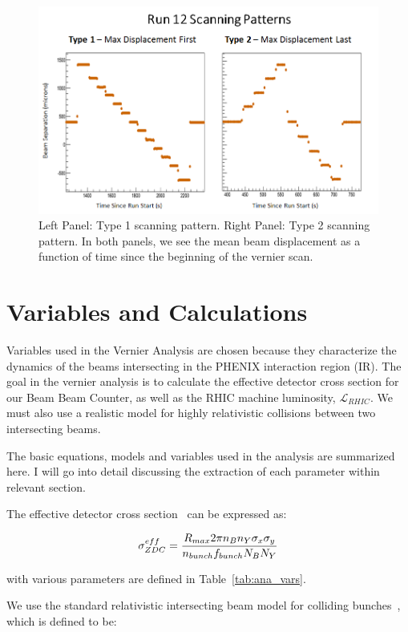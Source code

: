 \begin{figure}[ht] 
  \centering
  \includegraphics[width=0.75\linewidth]{./figures/scan_patterns} 
  \caption{ 
    Left Panel: Type 1 scanning pattern. Right Panel: Type 2 scanning pattern.
    In both panels, we see the mean beam displacement as a function of time
    since the beginning of the vernier scan.
  }
  \label{fig:scan_patterns}
\end{figure}

\section{Variables and Calculations}
\label{sec:VariablesAndCalculations}

Variables used in the Vernier Analysis are chosen because they characterize the
dynamics of the beams intersecting in the PHENIX interaction region (IR). The
goal in the vernier analysis is to calculate the effective detector cross
section for our Beam Beam Counter, as well as the RHIC machine luminosity,
$\mathcal{L}_{RHIC}$. We must also use a realistic model for highly relativistic
collisions between two intersecting beams.

The basic equations, models and variables used in the analysis are summarized
here. I will go into detail discussing the extraction of each parameter within
relevant section.

The effective detector cross section~\cite{Drees2013} can be expressed as:

\begin{equation}
\label{eq:detector_xsec}
\sigma_{ZDC}^{eff} = {{R_{max} 2\pi n_{B} n_{Y} \sigma_{x} \sigma_{y}}\over{n_{bunch}
f_{bunch} N_{B} N_{Y} }}
\end{equation}

{\noindent}with various parameters are defined in Table~\ref{tab:ana_vars}.

{\noindent}We use the standard relativistic intersecting beam model for
colliding bunches~\cite{an888}, which is defined to be:

